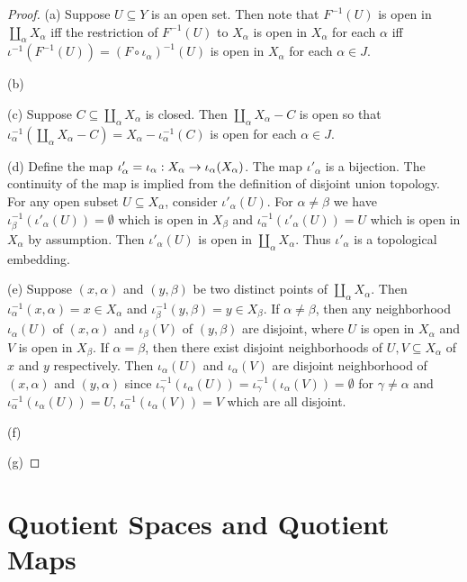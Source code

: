 \documentclass[11pt,a4paper]{article}
\begin{document}
\begin{proof}
(a) Suppose $U\subseteq Y$ is an open set. Then note that $F^{-1}(U)$ is open in $\coprod_{\alpha}X_\alpha$ iff the restriction of $F^{-1}(U)$ to $X_\alpha$ is open in $X_\alpha$ for each $\alpha$ iff $\iota^{-1}(F^{-1}(U)) = (F\circ \iota_\alpha)^{-1}(U)$ is open in $X_\alpha$ for each $\alpha\in J$.

(b)

(c) Suppose $C\subseteq \coprod_{\alpha}X_\alpha$ is closed. Then $\coprod_{\alpha}X_\alpha-C$ is open so that $\iota_\alpha^{-1}(\coprod_{\alpha}X_\alpha-C) = X_\alpha - \iota_\alpha^{-1}(C)$ is open for each $\alpha\in J$.

(d) Define the map $\iota'_\alpha=\iota_\alpha:X_\alpha\rightarrow \iota_\alpha(X_\alpha)$. The map $\iota'_\alpha$ is a bijection. The continuity of the map is implied from the definition of disjoint union topology. For any open subset $U\subseteq X_\alpha$, consider $\iota'_\alpha(U)$. For $\alpha\neq \beta$ we have $\iota_\beta^{-1}(\iota'_\alpha(U)) = \emptyset$ which is open in $X_\beta$ and $\iota_\alpha^{-1}(\iota'_\alpha(U)) = U$ which is open in $X_\alpha$ by assumption. Then $\iota'_\alpha(U)$ is open in $\coprod_\alpha X_\alpha$. Thus $\iota'_\alpha$ is a topological embedding.

(e) Suppose $(x,\alpha)$ and $(y,\beta)$ be two distinct points of $\coprod_\alpha X_\alpha$. Then $\iota_\alpha^{-1}(x,\alpha) = x\in X_\alpha$ and $\iota_\beta^{-1}(y,\beta) = y\in X_\beta$. If $\alpha\neq\beta$, then any neighborhood $\iota_\alpha(U)$ of $(x,\alpha)$ and $\iota_\beta(V)$ of $(y,\beta)$ are disjoint, where $U$ is open in $X_\alpha$ and $V$ is open in $X_\beta$. If $\alpha=\beta$, then there exist disjoint neighborhoods of $U,V\subseteq X_\alpha$ of $x$ and $y$ respectively. Then $\iota_\alpha(U)$ and $\iota_\alpha(V)$ are disjoint neighborhood of $(x,\alpha)$ and $(y,\alpha)$ since $\iota_\gamma^{-1}(\iota_\alpha(U)) = \iota_\gamma^{-1}(\iota_\alpha(V)) = \emptyset$ for $\gamma\neq \alpha$ and $\iota_\alpha^{-1}(\iota_\alpha(U)) = U$, $\iota_\alpha^{-1}(\iota_\alpha(V)) = V$ which are all disjoint.

(f)

(g)
\end{proof}

\section{Quotient Spaces and Quotient Maps}
\end{document}
